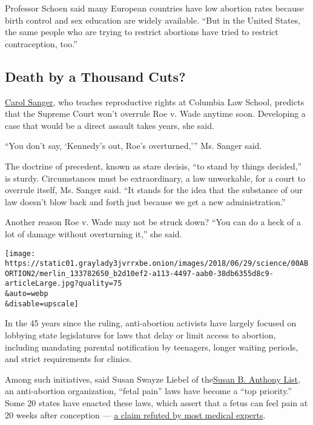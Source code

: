 Professor Schoen said many European countries have low abortion rates
because birth control and sex education are widely available. ``But in
the United States, the same people who are trying to restrict abortions
have tried to restrict contraception, too.''

\hypertarget{death-by-a-thousand-cuts}{%
\subsection{Death by a Thousand Cuts?}\label{death-by-a-thousand-cuts}}

\href{https://www.law.columbia.edu/faculty/carol-sanger}{Carol Sanger},
who teaches reproductive rights at Columbia Law School, predicts that
the Supreme Court won't overrule Roe v. Wade anytime soon. Developing a
case that would be a direct assault takes years, she said.

``You don't say, `Kennedy's out, Roe's overturned,''' Ms. Sanger said.

The doctrine of precedent, known as stare decisis, ``to stand by things
decided,'' is sturdy. Circumstances must be extraordinary, a law
unworkable, for a court to overrule itself, Ms. Sanger said. ``It stands
for the idea that the substance of our law doesn't blow back and forth
just because we get a new administration.''

Another reason Roe v. Wade may not be struck down? ``You can do a heck
of a lot of damage without overturning it,'' she said.

\texttt{[image: https://static01.graylady3jvrrxbe.onion/images/2018/06/29/science/00ABORTION2/merlin\_133782650\_b2d10ef2-a113-4497-aab0-38db6355d8c9-articleLarge.jpg?quality=75\\\&auto=webp\\\&disable=upscale]}

In the 45 years since the ruling, anti-abortion activists have largely
focused on lobbying state legislatures for laws that delay or limit
access to abortion, including mandating parental notification by
teenagers, longer waiting periods, and strict requirements for clinics.

Among such initiatives, said Susan Swayze Liebel of
the\href{https://www.sba-list.org/}{Susan B. Anthony List}, an
anti-abortion organization, ``fetal pain'' laws have become a ``top
priority.'' Some 20 states have enacted these laws, which assert that a
fetus can feel pain at 20 weeks after conception ---
\href{https://www.nytimes3xbfgragh.onion/2013/09/17/health/complex-science-at-issue-in-politics-of-fetal-pain.html}{a
claim refuted by most medical experts}.

